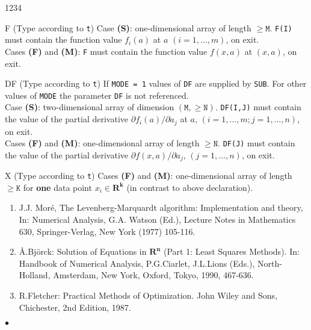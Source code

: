 \begin{DLtt}{1234}
\item[F] (Type according to {\tt t})
Case {\bf (S)}: one-dimensional array of length $\mathtt{\ge M}$.
  {\tt F(I)} must contain the function value
  $f_i(a)$ at $a$ $(i=1, \ldots ,m)$, on exit. \\
Cases {\bf (F)} and {\bf (M)}:  {\tt F} must contain the function value
$f(x,a)$ at $(x,a)$, on exit.
\item[DF] (Type according to {\tt t}) If {\tt MODE = 1}     values of
{\tt DF} are supplied by {\tt SUB}. For other values of {\tt MODE} the
parameter {\tt DF} is not referenced. \\
Case {\bf (S)}: two-dimensional array of dimension $\mathtt{(M, \ge N)}$.
{\tt DF(I,J)} must contain the value of the partial derivative
  $\partial f_i(a) / \partial a_j $ at $a$,
  $(i=1, \ldots , m ; j=1, \ldots ,n)$, on exit. \\
Cases {\bf (F)} and {\bf (M)}: one-dimensional array of length
$\mathtt{ \ge N}$.
{\tt DF(J)} must contain the value of the partial   derivative
  $\partial f(x, a) / \partial a_j$, $(j=1, \ldots ,n)$,
  on exit.
\item[X] (Type according to {\tt t}) Cases {\bf (F)} and {\bf (M)}:
one-dimensional array of length $\mathtt{\ge K}$ for {\bf one}
data point $x_i \in \mathbf{R^k}$ (in contrast to above declaration).
\end{DLtt}
 
\Refer
\begin{enumerate}
\item J.J. Mor\'e, The Levenberg-Marquardt algorithm: Implementation
 and theory, In: Numerical Analysis, G.A. Watson (Ed.), Lecture Notes
 in Mathematics 630, Springer-Verlag, New York (1977) 105-116.
\item {\AA}.Bj\"orck: Solution of Equations in $\mathbf{R^n}$
(Part 1: Least Squares Methods).
      In: Handbook of Numerical Analysis,
      P.G.Ciarlet, J.L.Lions (Eds.),
      North-Holland, Amsterdam, New York, Oxford,
      Tokyo, 1990, 467-636.
\item R.Fletcher: Practical Methods of Optimization.
      John Wiley and Sons, Chichester, 2nd Edition, 1987.
\end{enumerate}
$\bullet$
